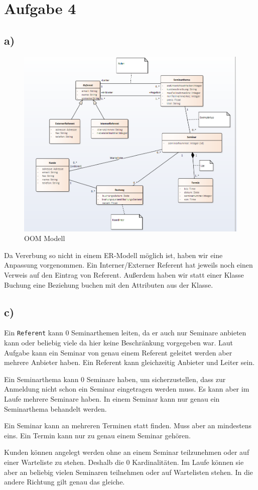\documentclass[10pt,a4paper]{report}
\begin{document}
\section{Aufgabe 4}
\subsection{a)}


\begin{figure}[ht!]
	\includegraphics[scale=0.6]{Bilder/diagram02.PNG}
	\caption{OOM Modell}
	\label{er:1}
\end{figure}

Da Vererbung so nicht in einem ER-Modell möglich ist, haben wir eine Anpassung vorgenommen. Ein Interner/Externer Referent hat jeweils noch einen Verweis auf den Eintrag von Referent.
Außerdem haben wir statt einer Klasse Buchung eine Beziehung buchen mit den Attributen aus der Klasse.

\subsection{c)}

Ein \texttt{Referent} kann 0 Seminarthemen leiten, da er auch nur Seminare anbieten kann oder beliebig viele da hier keine Beschränkung vorgegeben war. 
Laut Aufgabe kann ein Seminar von genau einem Referent geleitet werden aber mehrere Anbieter haben. Ein Referent kann gleichzeitig Anbieter und Leiter sein.

Ein Seminarthema kann 0 Seminare haben, um sicherzustellen, dass zur Anmeldung nicht schon ein Seminar eingetragen werden muss. Es kann aber im Laufe mehrere Seminare haben.
In einem Seminar kann nur genau ein Seminarthema behandelt werden.

Ein Seminar kann an mehreren Terminen statt finden. Muss aber an mindestens eins. Ein Termin kann nur zu genau einem Seminar gehören.

Kunden können angelegt werden ohne an einem Seminar teilzunehmen oder auf einer Warteliste zu stehen. Deshalb die 0 Kardinalitäten. Im Laufe können sie aber an beliebig vielen Seminaren teilnehmen oder auf Wartelisten stehen. In die andere Richtung gilt genau das gleiche.
\end{document}
